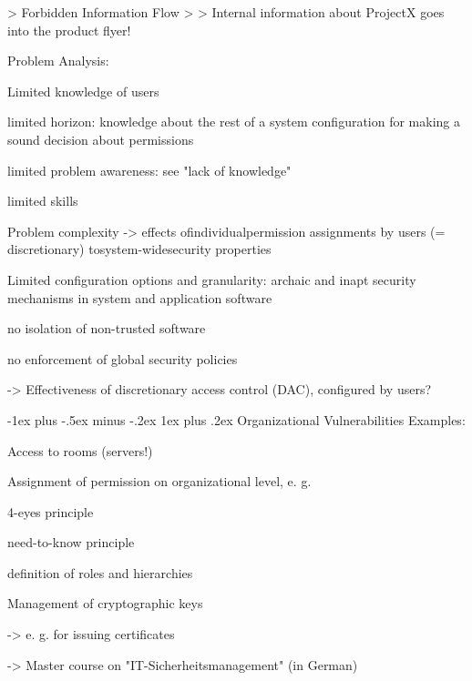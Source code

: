 \documentclass[a4paper]{article}
\makeatletter
\renewcommand{\subsubsection}{\@startsection{subsubsection}{3}{0mm}%
                                {-1ex plus -.5ex minus -.2ex}%
                                {1ex plus .2ex}%
                                {\normalfont\small\bfseries}}
\makeatother
\begin{document}
\begin{multicols}{3}
    > Forbidden Information Flow
    >
    > Internal information about ProjectX goes into the product flyer!

    Problem Analysis:
    \begin{itemize*}
        \item Limited knowledge of users
              \begin{itemize*}
                  \item limited horizon: knowledge about the rest of a system configuration for making a sound decision about permissions
                  \item limited problem awareness: see "lack of knowledge"
                  \item limited skills
              \end{itemize*}
        \item Problem complexity ->  effects ofindividualpermission assignments by users
              (= discretionary) tosystem-widesecurity properties
        \item Limited configuration options and granularity: archaic and inapt security mechanisms in system and application software
              \begin{itemize*}
                  \item no isolation of non-trusted software
                  \item no enforcement of global security policies
              \end{itemize*}
        \item ->  Effectiveness of discretionary access control (DAC), configured by users?
    \end{itemize*}

    \subsubsection{Organizational Vulnerabilities}
    Examples:
    \begin{itemize*}
        \item Access to rooms (servers!)
        \item Assignment of permission on organizational level, e. g.
              \begin{itemize*}
                  \item 4-eyes principle
                  \item need-to-know principle
                  \item definition of roles and hierarchies
              \end{itemize*}
        \item Management of cryptographic keys
              \begin{itemize*}
                  \item ->  e. g. for issuing certificates
              \end{itemize*}
        \item ->  Master course on "IT-Sicherheitsmanagement" (in German)
    \end{itemize*}


\end{multicols}
\end{document}
